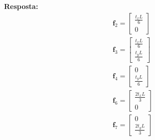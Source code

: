 %
\color{blue}
\textbf{Resposta:}
\begin{equation}
	\begin{split}
		&\mathbf{f}_2 =
		\begin{bmatrix}
			\frac{t_x L}{6}\\
			0
		\end{bmatrix}\\
		&\mathbf{f}_3 =
		\begin{bmatrix}
		\frac{t_x L}{6}\\
		\frac{t_y L}{6}
		\end{bmatrix}\\
		&\mathbf{f}_4 =
		\begin{bmatrix}
		0\\
		\frac{t_y L}{6}
		\end{bmatrix}\\
		&\mathbf{f}_6 =
		\begin{bmatrix}
		\frac{2 t_x L}{3}\\
		0
		\end{bmatrix}\\
		&\mathbf{f}_7 =
		\begin{bmatrix}
		0\\
		\frac{2 t_y L}{3}
		\end{bmatrix}
	\end{split}
\end{equation}
\color{black}


